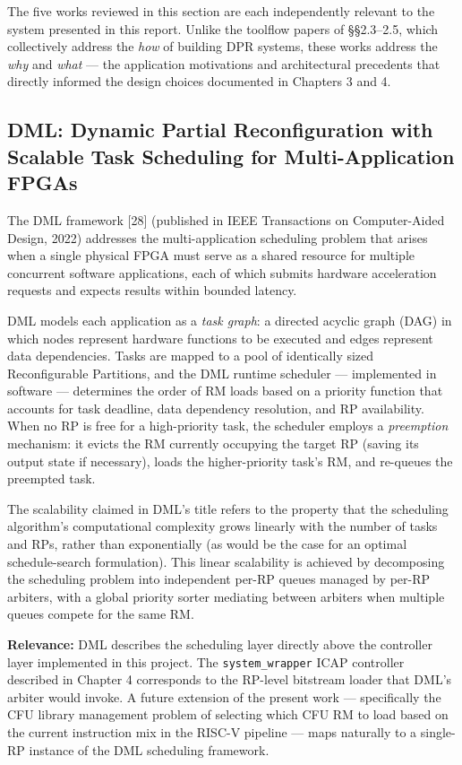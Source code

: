 The five works reviewed in this section are each independently relevant to the system presented in this report. Unlike the toolflow papers of §§2.3–2.5, which collectively address the \textit{how} of building DPR systems, these works address the \textit{why} and \textit{what} — the application motivations and architectural precedents that directly informed the design choices documented in Chapters 3 and 4.

\subsection{DML: Dynamic Partial Reconfiguration with Scalable Task Scheduling for Multi-Application FPGAs}

The DML framework [28] (published in IEEE Transactions on Computer-Aided Design, 2022) addresses the multi-application scheduling problem that arises when a single physical FPGA must serve as a shared resource for multiple concurrent software applications, each of which submits hardware acceleration requests and expects results within bounded latency.

DML models each application as a \textit{task graph}: a directed acyclic graph (DAG) in which nodes represent hardware functions to be executed and edges represent data dependencies. Tasks are mapped to a pool of identically sized Reconfigurable Partitions, and the DML runtime scheduler — implemented in software — determines the order of RM loads based on a priority function that accounts for task deadline, data dependency resolution, and RP availability. When no RP is free for a high-priority task, the scheduler employs a \textit{preemption} mechanism: it evicts the RM currently occupying the target RP (saving its output state if necessary), loads the higher-priority task's RM, and re-queues the preempted task.

The scalability claimed in DML's title refers to the property that the scheduling algorithm's computational complexity grows linearly with the number of tasks and RPs, rather than exponentially (as would be the case for an optimal schedule-search formulation). This linear scalability is achieved by decomposing the scheduling problem into independent per-RP queues managed by per-RP arbiters, with a global priority sorter mediating between arbiters when multiple queues compete for the same RM.

\textbf{Relevance:} DML describes the scheduling layer directly above the controller layer implemented in this project. The \texttt{system\_wrapper} ICAP controller described in Chapter 4 corresponds to the RP-level bitstream loader that DML's arbiter would invoke. A future extension of the present work — specifically the CFU library management problem of selecting which CFU RM to load based on the current instruction mix in the RISC-V pipeline — maps naturally to a single-RP instance of the DML scheduling framework.

